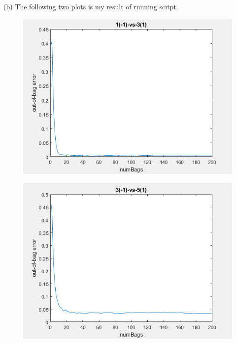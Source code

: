 \documentclass{article}
\begin{document}
\maketitle
\section{}
\begin{tlist}{4}
  \item[(b)] The following two plots is my result of running  script.
    \begin{figure}[H]\centering\includegraphics[width=\textwidth]{1vs3.png}\end{figure}
    \begin{figure}[H]\centering\includegraphics[width=\textwidth]{3vs5.png}\end{figure}

\end{tlist}
\end{document}
